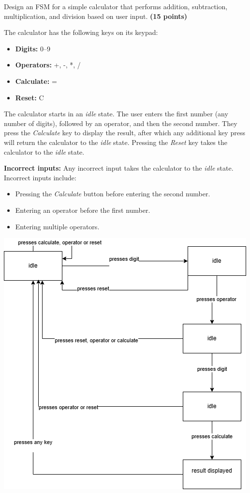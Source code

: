 \documentclass[10pt,answers]{exam}
\newcommand{\qpoints}[1]{\hfill \textbf{(#1 points)}}
\begin{document}
\begin{questions}

\question Design an FSM for a simple calculator that performs addition, subtraction, multiplication, and division based on user input. \qpoints{15}

The calculator has the following keys on its keypad:
\begin{itemize}
    \item \textbf{Digits:} 0--9
    \item \textbf{Operators:} +, -, *, /
    \item \textbf{Calculate:} =
    \item \textbf{Reset:} C
\end{itemize}

The calculator starts in an \textit{idle} state. The user enters the first number (any number of digits), followed by an operator, and then the second number. They press the \textit{Calculate} key to display the result, after which any additional key press will return the calculator to the \textit{idle} state. Pressing the \textit{Reset} key takes the calculator to the \textit{idle} state.

\textbf{Incorrect inputs:} Any incorrect input takes the calculator to the \textit{idle} state. Incorrect inputs include:
\begin{itemize}
    \item Pressing the \textit{Calculate} button before entering the second number.
    \item Entering an operator before the first number.
    \item Entering multiple operators.
\end{itemize}

\begin{solution}
    \begin{center}
		\includegraphics[width=0.6\linewidth]{ex1.png}
		\end{center}
\end{solution}


\end{questions}
\end{document}
